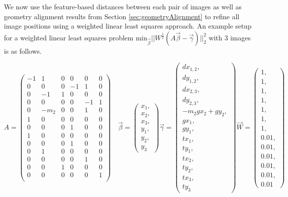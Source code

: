 \documentclass[]{spie}  %
\begin{document}
We now use the feature-based distances between each pair of images as
well as geometry alignment results from Section
\ref{sec:geometryAlignment} to refine all image positions using a
weighted linear least squares approach. An example setup for a
weighted linear least squares problem $\textrm{min}_{\vec{\beta}}
||W^\frac{1}{2}(A \vec{\beta} - \vec{\gamma})||_2^2 $ with 3 images is
as follows.

\[
A =
\begin{pmatrix}
  -1 & 1 & 0 & 0 & 0 & 0\\
  0 & 0 & 0 & -1 & 1 & 0\\
  0 & -1 & 1 & 0 & 0 & 0\\
  0 & 0 & 0 & 0 & -1 & 1\\
  0 & -m_2 & 0 & 0 & 1 & 0\\
  1 & 0 & 0 & 0 & 0 & 0\\
  0 & 0 & 0 & 1 & 0 & 0\\
  1 & 0 & 0 & 0 & 0 & 0\\
  0 & 0 & 0 & 1 & 0 & 0\\
  0 & 1 & 0 & 0 & 0 & 0\\
  0 & 0 & 0 & 0 & 1 & 0\\
  0 & 0 & 1 & 0 & 0 & 0\\
  0 & 0 & 0 & 0 & 0 & 1\\


\end{pmatrix}\quad
\vec{\beta} =
\begin{pmatrix}
  x_1, \\ x_2, \\ x_3, \\ y_1, \\ y_2, \\ y_3
\end{pmatrix}
\vec{\gamma} =
\begin{pmatrix}
  dx_{1,2}, \\ dy_{1,2}, \\ dx_{2,3}, \\ dy_{2,3}, \\ -m_2gx_2 + gy_2,
  \\ gx_1, \\ gy_1, \\ tx_1, \\ ty_1, \\ tx_2, \\ ty_2, \\ tx_3, \\
  ty_3
  
\end{pmatrix}
\vec{W} =
\begin{pmatrix}
  1, \\ 1, \\ 1, \\ 1, \\ 1, \\ 1, \\ 1, \\ 0.01, \\ 0.01, \\ 0.01, \\
  0.01, \\ 0.01, \\ 0.01
\end{pmatrix}
\]
\end{document}
